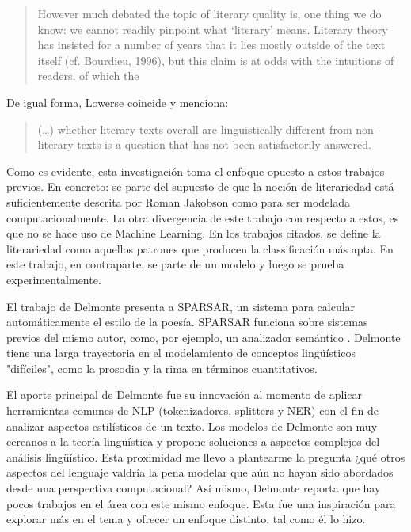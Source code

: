 \documentclass[12pt,letterpaper,twoside]{article}
\begin{document}
\begin{quote}
However much debated the topic of literary quality is, one thing we do
know: we cannot readily pinpoint what ‘literary’ means. Literary
theory has insisted for a number of years that it lies mostly outside
of the text itself (cf. Bourdieu, 1996), but this claim is at odds
with the intuitions of readers, of which the
\cite[pg. 58]{van2015identifying}
\end{quote}


De igual forma, Lowerse coincide y menciona:


\begin{quote}
(\ldots{}) whether literary texts overall are linguistically different from
non-literary texts is a question that has not been satisfactorily
answered.\cite[pg. 176]{louwerse2008computationally}
\end{quote}


Como es evidente, esta investigación toma el enfoque opuesto a estos
trabajos previos. En concreto: se parte del supuesto de que la noción
de literariedad está suficientemente descrita por Roman Jakobson como
para ser modelada computacionalmente.  La otra divergencia de este
trabajo con respecto a estos, es que no se hace uso de Machine
Learning. En los trabajos citados, se define la literariedad como
aquellos patrones que producen la classificación más apta. En este
trabajo, en contraparte, se parte de un modelo y luego se prueba
experimentalmente.


El trabajo de Delmonte \cite{delmonte2013computing} presenta a
SPARSAR, un sistema para calcular automáticamente el estilo de la
poesía. SPARSAR funciona sobre sistemas previos del mismo autor, como,
por ejemplo, un analizador semántico \cite{delmonte2005venses}.
Delmonte tiene una larga trayectoria en el modelamiento de conceptos
lingüísticos "difíciles", como la prosodia y la rima en términos
cuantitativos.

El aporte principal de Delmonte fue su innovación al momento de aplicar
herramientas comunes de NLP (tokenizadores, splitters y NER) con el fin
de analizar aspectos estilísticos de un texto. Los modelos de Delmonte
son muy cercanos a la teoría lingüística y propone soluciones a aspectos
complejos del análisis lingüístico. Esta proximidad me llevo a
plantearme la pregunta ¿qué otros aspectos del lenguaje valdría la pena
modelar que aún no hayan sido abordados desde una perspectiva
computacional? Así mismo, Delmonte reporta que hay pocos trabajos en el
área con este mismo enfoque. Esta fue una inspiración para explorar más
en el tema y ofrecer un enfoque distinto, tal como él lo hizo.
\end{document}
